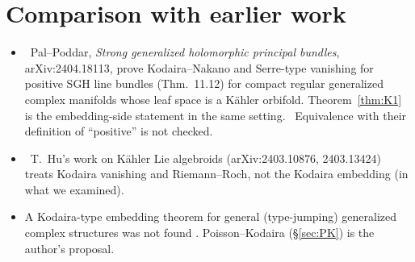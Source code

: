 \section{Comparison with earlier work}\label{sec:compare}
\begin{itemize}
\item \tC\ Pal--Poddar, \emph{Strong generalized holomorphic principal bundles}, arXiv:2404.18113, prove Kodaira--Nakano and Serre-type vanishing for positive SGH line bundles (Thm.~11.12) for compact regular generalized complex manifolds whose leaf space is a K\"ahler orbifold. Theorem~\ref{thm:K1} is the embedding-side statement in the same setting. \tQ\ Equivalence with their definition of ``positive'' is not checked.
\item \tC\ T.\ Hu's work on K\"ahler Lie algebroids (arXiv:2403.10876, 2403.13424) treats Kodaira vanishing and Riemann--Roch, not the Kodaira embedding (in what we examined).
\item A Kodaira-type embedding theorem for general (type-jumping) generalized complex structures was not found \tC. Poisson--Kodaira (\S\ref{sec:PK}) is the author's proposal.
\end{itemize}

